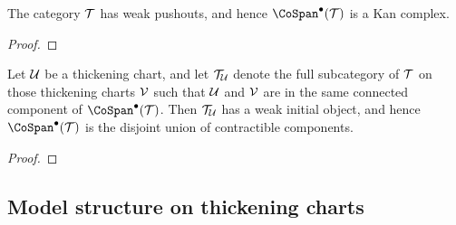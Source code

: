 \begin{prop}\label{weak-pullback-charts}
The category $\mathcal T$ has weak pushouts, and hence $\CoSpan^\bullet(\cT)$ is a Kan complex. 
\end{prop}

\begin{proof}
\jake{[To be done.]}
\end{proof}

\begin{prop}\label{weak-initial-charts}
Let $\mathcal U$ be a thickening chart, and let $\mathcal T_\mathcal U$ denote the full subcategory of $\mathcal T$ on those thickening charts $\mathcal V$ such that $\mathcal U$ and $\mathcal V$ are in the same connected component of $\CoSpan^\bullet(\cT)$. Then $\mathcal T_\mathcal U$ has a weak initial object, and hence $\CoSpan^\bullet(\cT)$ is the disjoint union of contractible components. 
\end{prop}

\begin{proof}
\jake{[To be done.]}
\end{proof}

\subsection{Model structure on thickening charts}

